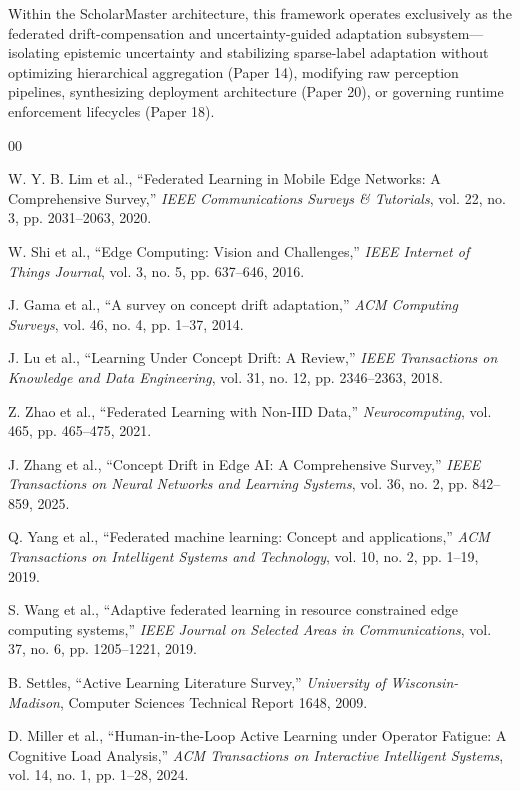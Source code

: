 \documentclass[conference]{IEEEtran}
\begin{document}
Within the ScholarMaster architecture, this framework operates exclusively as the federated drift-compensation and uncertainty-guided adaptation subsystem---isolating epistemic uncertainty and stabilizing sparse-label adaptation without optimizing hierarchical aggregation (Paper 14), modifying raw perception pipelines, synthesizing deployment architecture (Paper 20), or governing runtime enforcement lifecycles (Paper 18).

\begin{thebibliography}{00}

 W. Y. B. Lim et al., ``Federated Learning in Mobile Edge Networks: A Comprehensive Survey,'' \textit{IEEE Communications Surveys \& Tutorials}, vol. 22, no. 3, pp. 2031--2063, 2020.

 W. Shi et al., ``Edge Computing: Vision and Challenges,'' \textit{IEEE Internet of Things Journal}, vol. 3, no. 5, pp. 637--646, 2016.

 J. Gama et al., ``A survey on concept drift adaptation,'' \textit{ACM Computing Surveys}, vol. 46, no. 4, pp. 1--37, 2014.

 J. Lu et al., ``Learning Under Concept Drift: A Review,'' \textit{IEEE Transactions on Knowledge and Data Engineering}, vol. 31, no. 12, pp. 2346--2363, 2018.

 Z. Zhao et al., ``Federated Learning with Non-IID Data,'' \textit{Neurocomputing}, vol. 465, pp. 465--475, 2021.

 J. Zhang et al., ``Concept Drift in Edge AI: A Comprehensive Survey,'' \textit{IEEE Transactions on Neural Networks and Learning Systems}, vol. 36, no. 2, pp. 842--859, 2025.

 Q. Yang et al., ``Federated machine learning: Concept and applications,'' \textit{ACM Transactions on Intelligent Systems and Technology}, vol. 10, no. 2, pp. 1--19, 2019.

 S. Wang et al., ``Adaptive federated learning in resource constrained edge computing systems,'' \textit{IEEE Journal on Selected Areas in Communications}, vol. 37, no. 6, pp. 1205--1221, 2019.

 B. Settles, ``Active Learning Literature Survey,'' \textit{University of Wisconsin-Madison}, Computer Sciences Technical Report 1648, 2009.

 D. Miller et al., ``Human-in-the-Loop Active Learning under Operator Fatigue: A Cognitive Load Analysis,'' \textit{ACM Transactions on Interactive Intelligent Systems}, vol. 14, no. 1, pp. 1--28, 2024.


\end{thebibliography}
\end{document}
